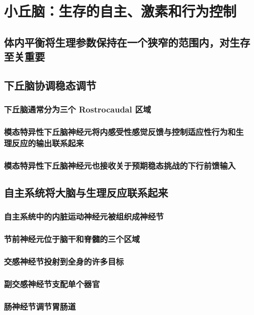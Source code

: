 \chapter{小丘脑：生存的自主、激素和行为控制}

\section{体内平衡将生理参数保持在一个狭窄的范围内，对生存至关重要}

\section{下丘脑协调稳态调节}
\subsection{下丘脑通常分为三个 Rostrocaudal 区域}
\subsection{模态特异性下丘脑神经元将内感受性感觉反馈与控制适应性行为和生理反应的输出联系起来}
\subsection{模态特异性下丘脑神经元也接收关于预期稳态挑战的下行前馈输入}

\section{自主系统将大脑与生理反应联系起来}
\subsection{自主系统中的内脏运动神经元被组织成神经节}
\subsection{节前神经元位于脑干和脊髓的三个区域}
\subsection{交感神经节投射到全身的许多目标}
\subsection{副交感神经节支配单个器官}
\subsection{肠神经节调节胃肠道}

